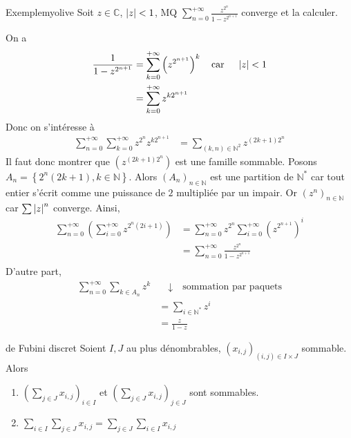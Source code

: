     \begin{omed}{Exemple}{myolive}
        Soit $z \in \mathbb{C}$, $\left\lvert z\right\rvert < 1$, MQ $\sum_{n = 0}^{+\infty} \frac{z^{2^n}}{1 - z^{2^{n+1}}}$ converge et la calculer.

        On a 
        \begin{align*}
            \frac{1}{1 - z^{2^{n+1}}} &= \sum_{k=0}^{+\infty} \left(z^{2^{n+1}}\right)^k \quad \text{car } \quad \left\lvert z\right\rvert < 1 \\
            &= \sum_{k=0}^{+\infty} z^{k 2^{n+1}}
        \end{align*}
        Donc on s’intéresse à 
        \begin{align*}
            \sum_{n = 0}^{+\infty} \sum_{k = 0}^{+\infty} z^{2^n} z^{k 2^{n+1}} 
            &= \sum_{(k,n) \in \mathbb{N}^2} z^{(2k+1)2^n}
        \end{align*}
        Il faut donc montrer que $(z^{(2k+1)2^n})$ est une famille sommable. Posons $A_n = \left\{2^n (2k+1), k \in \mathbb{N}\right\}$. Alors $(A_n)_{n \in \mathbb{N}}$ est une partition de $\mathbb{N}^*$ car tout entier s’écrit comme une puissance de $2$ multipliée par un impair. Or $(z^n)_{n \in \mathbb{N}}$ car $\sum \left\lvert z\right\rvert^n$ converge. Ainsi, 
        \begin{align*}
            \sum_{n=0}^{+\infty} \left(\sum_{i = 0}^{+\infty} z^{2^n (2i + 1)}\right) 
            &= \sum_{n=0}^{+\infty}z^{2^n} \sum_{i = 0}^{+\infty} (z^{2^{n+1}})^i \\
            &= \sum_{n=0}^{+\infty} \frac{z^{2^n}}{1 - z^{2^{n+1}}} \\
        \end{align*}
        D’autre part, 
        \begin{align*}
            \sum_{n=0}^{+\infty} \sum_{k \in A_n} z^k &\quad \downarrow \quad \text{sommation par paquets} \\
            &= \sum_{i \in \mathbb{N}^*} z^i \\
            &= \frac{z}{1 - z}
        \end{align*}
    \end{omed}

    \begin{theo}{de Fubini discret}{}
        Soient $I,J$ au plus dénombrables, $(x_{i,j})_{(i,j) \in I \times J}$ sommable. Alors 
        \begin{enumerate}
            \item $\left(\sum_{j \in J} x_{i,j}\right)_{i \in I}$ et $\left(\sum_{j \in J} x_{i,j}\right)_{j \in J}$ sont sommables.
            \item $\sum_{i \in I} \sum_{j \in J} x_{i,j} = \sum_{j \in J} \sum_{i \in I} x_{i,j}$
        \end{enumerate}
    \end{theo}


